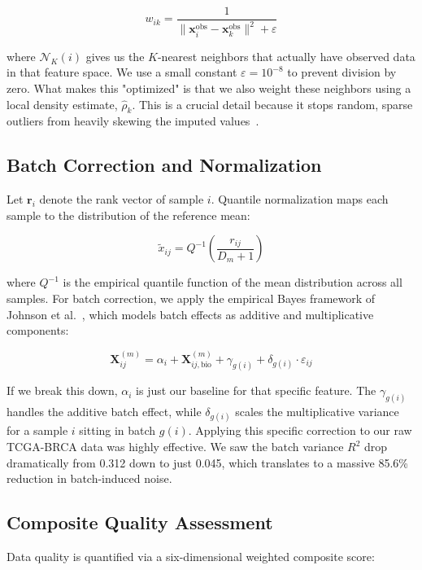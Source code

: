 \documentclass[conference,flushend]{iaria} %
\begin{document}
\begin{equation}
w_{ik} = \frac{1}{\|\mathbf{x}_i^{\text{obs}} - \mathbf{x}_k^{\text{obs}}\|^2 + \varepsilon}
\end{equation}

where $\mathcal{N}_K(i)$ gives us the $K$-nearest neighbors that actually have observed data in that feature space. We use a small constant $\varepsilon = 10^{-8}$ to prevent division by zero. What makes this "optimized" is that we also weight these neighbors using a local density estimate, $\hat{\rho}_k$. This is a crucial detail because it stops random, sparse outliers from heavily skewing the imputed values~\cite{troyanskaya2001}.

\subsection{Batch Correction and Normalization}
Let $\mathbf{r}_i$ denote the rank vector of sample $i$. Quantile normalization maps each sample to the distribution of the reference mean:

\begin{equation}
\tilde{x}_{ij} = Q^{-1}\left(\frac{r_{ij}}{D_m + 1}\right)
\end{equation}

where $Q^{-1}$ is the empirical quantile function of the mean distribution across all samples. For batch correction, we apply the empirical Bayes framework of Johnson et al.~\cite{johnson2007}, which models batch effects as additive and multiplicative components:

\begin{equation}
\mathbf{X}^{(m)}_{ij} = \alpha_i + \mathbf{X}^{(m)}_{ij,\text{bio}} + \gamma_{g(i)} + \delta_{g(i)} \cdot \varepsilon_{ij}
\end{equation}

If we break this down, $\alpha_i$ is just our baseline for that specific feature. The $\gamma_{g(i)}$ handles the additive batch effect, while $\delta_{g(i)}$ scales the multiplicative variance for a sample $i$ sitting in batch $g(i)$. Applying this specific correction to our raw TCGA-BRCA data was highly effective. We saw the batch variance $R^2$ drop dramatically from 0.312 down to just 0.045, which translates to a massive 85.6\% reduction in batch-induced noise.

\subsection{Composite Quality Assessment}
Data quality is quantified via a six-dimensional weighted composite score:
\end{document}
